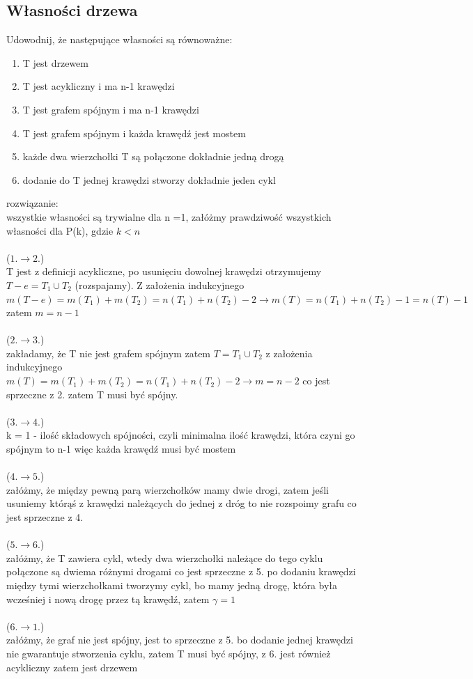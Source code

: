\documentclass{article}
\begin{document}
\subsection*{Własności drzewa}
Udowodnij, że następujące własności są równoważne: 
\begin{enumerate}
	\item T jest drzewem
	\item T jest acykliczny i ma n-1 krawędzi
	\item T jest grafem spójnym i ma n-1 krawędzi
	\item T jest grafem spójnym i każda krawędź jest mostem
	\item każde dwa wierzchołki T są połączone dokładnie jedną drogą
	\item dodanie do T jednej krawędzi stworzy dokładnie jeden cykl
\end{enumerate}
rozwiązanie:\\
wszystkie własności są trywialne dla n =1,  załóżmy prawdziwość wszystkich własności dla P(k), gdzie $k < n$ \\\\
($1. \rightarrow 2.$) \\
T jest z definicji acykliczne, po usunięciu dowolnej krawędzi otrzymujemy $T-e = T_1 \cup T_2$ (rozspajamy). 
Z założenia indukcyjnego $m(T-e) = m(T_1) + m(T_2) = n(T_1) + n(T_2) - 2 \rightarrow m(T) = n(T_1)+n(T_2)-1 = n(T) - 1$ zatem 
$m = n-1$ \\\\
($2. \rightarrow 3.$) \\
 zakładamy,  że T nie jest grafem spójnym zatem $T = T_1 \cup T_2$
z założenia indukcyjnego $m(T) = m(T_1) + m(T_2) = n(T_1) + n(T_2) - 2 \rightarrow m = n-2$ co jest sprzeczne z 2. 
zatem T musi być spójny. \\\\
($3. \rightarrow 4.$) \\
k = 1 - ilość składowych spójności, czyli minimalna ilość krawędzi, która czyni go spójnym to n-1 więc każda krawędź musi być mostem\\\\
($4. \rightarrow 5.$) \\
załóżmy, że między pewną parą wierzchołków mamy dwie drogi, zatem jeśli usuniemy którąś z krawędzi należących do jednej z dróg to 
nie rozspoimy grafu co jest sprzeczne z 4. \\\\
($5. \rightarrow 6.$) \\
załóżmy, że T zawiera cykl, wtedy dwa wierzchołki należące do tego cyklu połączone są dwiema różnymi drogami co jest sprzeczne
z 5.  po dodaniu krawędzi między tymi wierzchołkami tworzymy cykl,  bo mamy jedną drogę, która była wcześniej i nową drogę przez tą 
krawędź,  zatem $\gamma = 1$ \\\\
($6. \rightarrow 1.$) \\
załóżmy, że graf nie jest spójny, jest to sprzeczne z 5. bo dodanie jednej krawędzi nie gwarantuje stworzenia cyklu, 
zatem T musi być spójny, z 6. jest również acykliczny zatem jest drzewem \\\\
\end{document}
